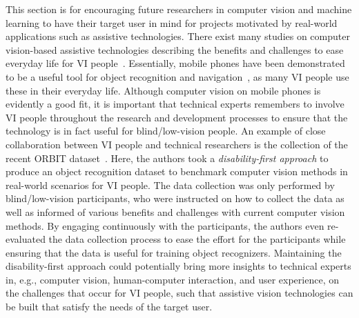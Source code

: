 This section is for encouraging future researchers in computer vision and machine learning to have their target user in mind for projects motivated by real-world applications such as assistive technologies.
There exist many studies on computer vision-based assistive technologies describing the benefits and challenges to ease everyday life for VI people~\cite{jayant2011supporting, tian2013toward, leo2017computer, tapu2020wearable, wang2019implications}. Essentially, mobile phones have been demonstrated to be a useful tool for object recognition and navigation~\cite{jayant2011supporting, vazquez2012helping, szpiro2016finding, gurari2018vizwiz}, as many VI people use these in their everyday life. 
Although computer vision on mobile phones is evidently a good fit, it is important that technical experts remembers to involve VI people throughout the research and development processes to ensure that the technology is in fact useful for blind/low-vision people. 
An example of close collaboration between VI people and technical researchers is the collection of the recent ORBIT dataset~\cite{massiceti2021orbit, theodorou2021disability}. Here, the authors took a \textit{disability-first approach} to produce an object recognition dataset to benchmark computer vision methods in real-world scenarios for VI people. The data collection was only performed by blind/low-vision participants, who were instructed on how to collect the data as well as informed of various benefits and challenges with current computer vision methods. By engaging continuously with the participants, the authors even re-evaluated the data collection process to ease the effort for the participants while ensuring that the data is useful for training object recognizers. 
Maintaining the disability-first approach could potentially bring more insights to technical experts in, e.g., computer vision, human-computer interaction, and user experience, on the challenges that occur for VI people, such that assistive vision technologies can be built that satisfy the needs of the target user. 

